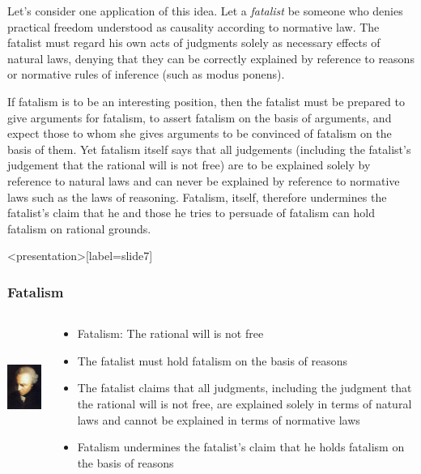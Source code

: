 Let’s consider one application of this idea. Let a \emph{fatalist} be someone who denies practical freedom understood as causality according to normative law. The fatalist must regard his own acts of judgments solely as necessary effects of natural laws, denying that they can be correctly explained by reference to reasons or normative rules of inference (such as modus ponens). 

If fatalism is to be an interesting position, then the fatalist must be prepared to give arguments for fatalism, to assert fatalism on the basis of arguments, and expect those to whom she gives arguments to be convinced of fatalism on the basis of them. Yet fatalism itself says that all judgements (including the fatalist’s judgement that the rational will is not free) are to be explained solely by reference to natural laws and can never be explained by reference to normative laws such as the laws of reasoning. Fatalism, itself, therefore undermines the fatalist’s claim that he and those he tries to persuade of fatalism can hold fatalism on rational grounds. \change

\begin{frame}<presentation>[label=slide7]
    \frametitle{Fatalism}
        \begin{columns}
            \begin{column}{3cm}
                \includegraphics[height=4cm]{../../graphics/kant.jpg}
            \end{column}
            \begin{column}{7cm}
                \begin{itemize}
                    \item \alert{Fatalism}: The rational will is not free
                    \item The fatalist must hold fatalism on the basis of reasons
                    \item The fatalist claims that all judgments, including the judgment that the rational will is not free, are explained solely in terms of natural laws and cannot be explained in terms of normative laws
                    \item Fatalism undermines the fatalist's claim that he holds fatalism on the basis of reasons
                \end{itemize}
            \end{column}
        \end{columns}
\end{frame}

